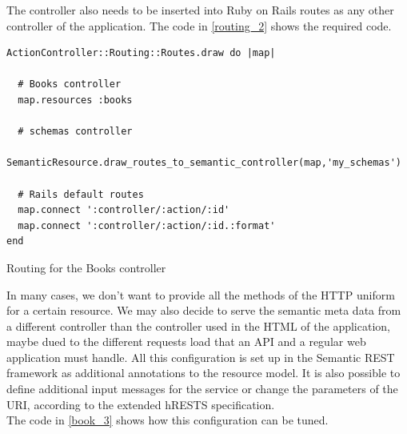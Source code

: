 The controller also needs to be inserted into Ruby on Rails routes as any other controller of the application. The code
in \ref{routing_2} shows the required code.

\begin{table}
\vspace{5 mm}
\begin{lstlisting}
ActionController::Routing::Routes.draw do |map|

  # Books controller
  map.resources :books

  # schemas controller
  SemanticResource.draw_routes_to_semantic_controller(map,'my_schemas')

  # Rails default routes
  map.connect ':controller/:action/:id'
  map.connect ':controller/:action/:id.:format'
end
\end{lstlisting} 
\vspace{5 mm}
\caption{Routing for the Books controller}
\label{routing_2}
\end{table}

In many cases, we don't want to provide all the methods of the HTTP uniform for a certain resource. We may also decide to serve
the semantic meta data from a different controller than the controller used in the HTML of the application, maybe dued to the
different requests load that an API and a regular web application must handle. All this configuration is set up in
the Semantic REST framework as additional annotations to the resource model. It is also possible to define additional input
messages for the service or change the parameters of the URI, according to the extended hRESTS specification.\\
The code in \ref{book_3} shows how this configuration can be tuned.

